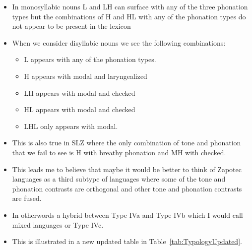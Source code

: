 \begin{itemize}
\begin{itemize}
        \item In monosyllabic nouns L and LH can surface with any of the three phonation types but the combinations of H and HL with any of the phonation types do not appear to be present in the lexicon
        \item When we consider disyllabic nouns we see the following combinations: 
        \begin{itemize}
            \item L appears with any of the phonation types. 
            \item H appears with modal and laryngealized
            \item LH appears with modal and checked
            \item HL appears with modal and checked
            \item LHL only appears with modal. 
        \end{itemize} 
        \item This is also true in SLZ where the only combination of tone and phonation that we fail to see is H with breathy phonation and MH with checked.
        \item This leads me to believe that maybe it would be better to think of Zapotec languages as a third subtype of languages where some of the tone and phonation contrasts are orthogonal and other tone and phonation contrasts are fused. 
        \item In otherwords a hybrid between Type IVa and Type IVb which I would call mixed languages or Type IVc.
        \item This is illustrated in a new updated table in Table~\ref{tab:TypologyUpdated}.
    \end{itemize}
\end{itemize}

